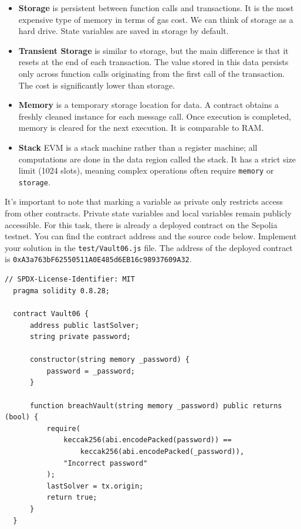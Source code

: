 \documentclass[12pt]{article}
\begin{document}
\begin{itemize}
\item \textbf{Storage} is persistent between function calls and transactions. It is the most expensive type of memory in terms of gas cost. We can think of storage as a hard drive. State variables are saved in storage by default.

\item \textbf{Transient Storage} is similar to storage, but the main difference is that it resets at the end of each transaction. The value stored in this data persists only across function calls originating from the first call of the transaction. The cost is significantly lower than storage.

\item \textbf{Memory} is a temporary storage location for data. A contract obtains a freshly cleaned instance for each message call. Once execution is completed, memory is cleared for the next execution. It is comparable to RAM.

\item \textbf{Stack} EVM is a stack machine rather than a register machine; all computations are done in the data region called the stack. It has a strict size limit (1024 slots), meaning complex operations often require \texttt{memory} or \texttt{storage}.

\end{itemize}

\noindent
It's important to note that marking a variable as private only restricts access from other contracts. Private state variables and local variables remain publicly accessible. For this task, there is already a deployed contract on the Sepolia testnet. You can find the contract address and the source code below. Implement your solution in the \texttt{test/Vault06.js} file. The address of the deployed contract is \texttt{0xA3a763bF62550511A0E485d6EB16c98937609A32}.

\begin{lstlisting}[language=Solidity]
  // SPDX-License-Identifier: MIT
  pragma solidity 0.8.28;
  
  contract Vault06 {
      address public lastSolver;
      string private password;
  
      constructor(string memory _password) {
          password = _password;
      }
  
      function breachVault(string memory _password) public returns (bool) {
          require(
              keccak256(abi.encodePacked(password)) ==
                  keccak256(abi.encodePacked(_password)),
              "Incorrect password"
          );
          lastSolver = tx.origin;
          return true;
      }
  }
\end{lstlisting}
\end{document}
